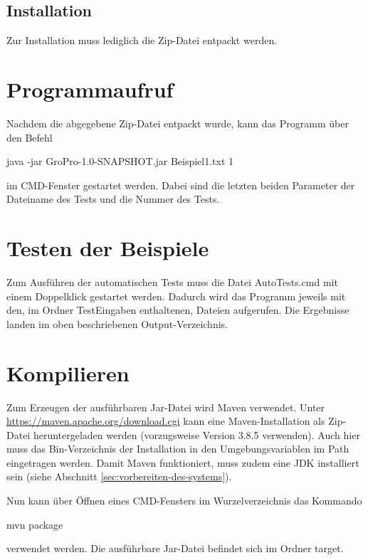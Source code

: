 \subsection{Installation}\label{subsec:installation}
Zur Installation muss lediglich die Zip-Datei entpackt werden.

\section{Programmaufruf}\label{sec:programmaufruf}
Nachdem die abgegebene Zip-Datei entpackt wurde, kann das Programm über den Befehl
\begin{center}
    \colorbox{gray!20}{
        \begin{minipage}{0.9\textwidth}
            java -jar GroPro-1.0-SNAPSHOT.jar Beispiel1.txt 1
        \end{minipage}
    }
\end{center}
im CMD-Fenster gestartet werden.
Dabei sind die letzten beiden Parameter der Dateiname des Tests und die Nummer des Tests.

\section{Testen der Beispiele}\label{sec:testen-der-beispiele}
Zum Ausführen der automatischen Tests muss die Datei \glqq AutoTests.cmd \grqq{} mit einem Doppelklick gestartet werden.
Dadurch wird das Programm jeweils mit den, im Ordner \glqq TestEingaben \grqq{} enthaltenen, Dateien aufgerufen.
Die Ergebnisse landen im oben beschriebenen Output-Verzeichnis.

\section{Kompilieren}\label{sec:kompilieren}

Zum Erzeugen der ausführbaren Jar-Datei wird Maven verwendet.
Unter \url{https://maven.apache.org/download.cgi} kann eine Maven-Installation als Zip-Datei heruntergeladen werden (vorzugsweise Version 3.8.5 verwenden).
Auch hier muss das Bin-Verzeichnis der Installation in den Umgebungsvariablen im Path eingetragen werden.
Damit Maven funktioniert, muss zudem eine JDK installiert sein (siehe Abschnitt \ref{sec:vorbereiten-des-systems}).

Nun kann über Öffnen eines CMD-Fensters im Wurzelverzeichnis das Kommando
\begin{center}
    \colorbox{gray!20}{
        \begin{minipage}{0.9\textwidth}
            mvn package
        \end{minipage}
    }
\end{center}
verwendet werden.
Die ausführbare Jar-Datei befindet sich im Ordner \glqq target\grqq{}.
